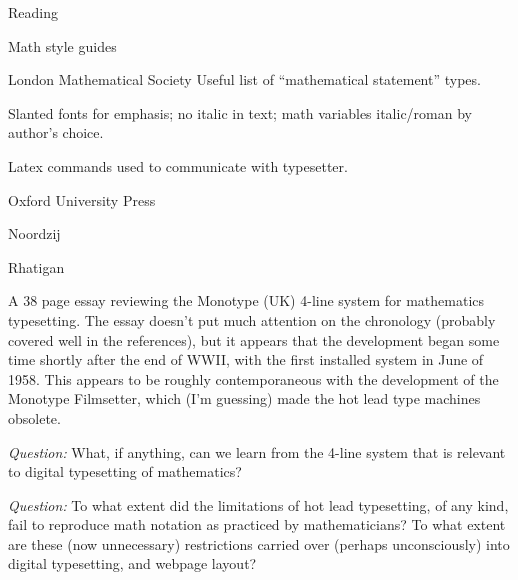 \documentclass[11pt]{PalisadesLakesBook}
\begin{document}
\begin{plSection}{Reading}
\begin{plSection}{Math style guides}
\begin{plSection}{London Mathematical Society}
Useful list of ``mathematical statement'' types.

Slanted fonts for emphasis; no italic in text;
math variables italic/roman by author's choice.

Latex commands used to communicate with typesetter.


\end{plSection}%
\begin{plSection}{Oxford University Press}


\end{plSection}%
\end{plSection}%
\begin{plSection}{Noordzij}



\end{plSection}%
\begin{plSection}{Rhatigan}
\begin{plSection}{}
\label{sec:FourLine}

A 38 page essay reviewing the Monotype (UK)
4-line system for mathematics typesetting.
The essay doesn't put much attention on the chronology
(probably covered well in the references),
but it appears that the development
began some time shortly after the end of WWII,
with the first installed system in June of 1958.
This appears to be roughly contemporaneous with
the development of the Monotype Filmsetter,
which (I'm guessing) made the hot lead type machines 
obsolete.~\cite{Eye:2012:MonotypeTimeline}

\emph{Question:} What, if anything, can we learn from the
4-line system that is relevant to digital typesetting
of mathematics?

\emph{Question:} To what extent did the limitations of
hot lead typesetting, of any kind, 
fail to reproduce math notation as practiced by mathematicians?
To what extent are these (now unnecessary) restrictions
carried over (perhaps unconsciously) into digital typesetting,
and webpage layout?


\end{plSection}
\end{plSection}
\end{plSection}
\end{document}
